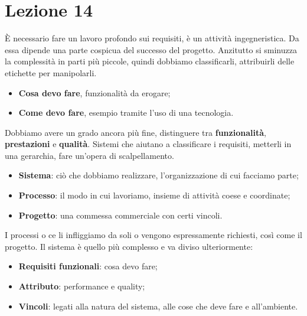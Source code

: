 \section{Lezione 14}

È necessario fare un lavoro profondo sui requisiti, è un attività ingegneristica. Da essa dipende una parte cospicua del successo del progetto. Anzitutto si sminuzza la complessità in parti più piccole, quindi dobbiamo classificarli, attribuirli delle etichette per manipolarli.

\begin{itemize}

	\item \textbf{Cosa devo fare}, funzionalità da erogare;
	\item \textbf{Come devo fare}, esempio tramite l'uso di una tecnologia.

\end{itemize}

Dobbiamo avere un grado ancora più fine, distinguere tra \textbf{funzionalità}, \textbf{prestazioni} e \textbf{qualità}. Sistemi che aiutano a classificare i requisiti, metterli in una gerarchia, fare un'opera di scalpellamento.

\begin{itemize}

	\item \textbf{Sistema}: ciò che dobbiamo realizzare, l'organizzazione di cui facciamo parte;
	\item \textbf{Processo}: il modo in cui lavoriamo, insieme di attività coese e coordinate;
	\item \textbf{Progetto}: una commessa commerciale con certi vincoli.

\end{itemize}

I processi o ce li infliggiamo da soli o vengono espressamente richiesti, così come il progetto. Il sistema è quello più complesso e va diviso ulteriormente:

\begin{itemize}

	\item \textbf{Requisiti funzionali}: cosa devo fare;
	\item \textbf{Attributo}: performance e quality;
	\item \textbf{Vincoli}: legati alla natura del sistema, alle cose che deve fare e all'ambiente. 

\end{itemize}

